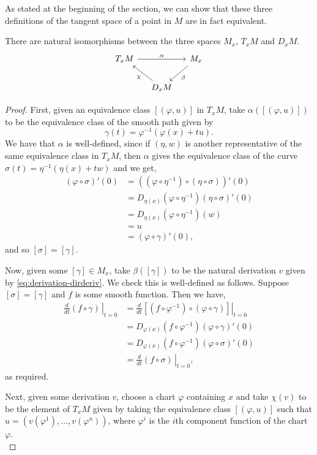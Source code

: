 As stated at the beginning of the section, we can show that these three definitions of the tangent space of a point in $M$ are in fact equivalent.
\begin{proposition}
There are natural isomorphisms between the three spaces $M_x$, $T_xM$ and $D_xM$.
\[
\begin{tikzcd}[column sep=small]
T_xM \arrow{rr}{\alpha} && M_x\arrow{dl}{\beta}\\
&D_xM\arrow{ul}{\chi}
\end{tikzcd}
\]
\end{proposition}
\begin{proof}
First, given an equivalence class $[(\varphi,u)]$ in $T_xM$, take $\alpha([(\varphi,u)])$ to be the equivalence class of the smooth path given by
\[
\gamma(t)=\varphi^{-1}(\varphi(x)+tu).
\]
We have that $\alpha$ is well-defined, since if $(\eta,w)$ is another representative of the same equivalence class in $T_xM$, then $\alpha$ gives the equivalence class of the curve $\sigma(t)=\eta^{-1}(\eta(x)+tw)$ and we get,
\begin{align*}
(\varphi\circ\sigma)'(0)&=\left((\varphi\circ\eta^{-1})\circ(\eta\circ\sigma) \right)'(0)\\
&=D_{\eta(x)}\left(\varphi\circ\eta^{-1} \right)(\eta\circ\sigma)'(0)\\
&=D_{\eta(x)}\left(\varphi\circ\eta^{-1}\right)(w)\\
&=u\\
&=(\varphi\circ\gamma)'(0),
\end{align*}
and so $[\sigma]=[\gamma]$.

Now, given some $[\gamma]\in M_x$, take $\beta([\gamma])$ to be the natural derivation $v$ given by \eqref{eq:derivation-dirderiv}. We check this is well-defined as follows. Suppose $[\sigma]=[\gamma]$ and $f$ is some smooth function. Then we have,
\begin{align*}
\left.\frac{d}{dt}(f\circ\gamma)\,\right\rvert_{t=0}&=\left.\frac{d}{dt}\left[(f\circ\varphi^{-1})\circ(\varphi\circ\gamma) \right]\right\rvert_{t=0}\\
&=D_{\varphi(x)}(f\circ\varphi^{-1})(\varphi\circ\gamma)'(0)\\
&=D_{\varphi(x)}(f\circ\varphi^{-1})(\varphi\circ\sigma)'(0)\\
&=\left.\frac{d}{dt}(f\circ\sigma)\,\right\rvert_{t=0},
\end{align*}
as required.

Next, given some derivation $v$, choose a chart $\varphi$ containing $x$ and take $\chi(v)$ to be the element of $T_xM$ given by taking the equivalence class $[(\varphi,u)]$ such that $u=\left(v(\varphi^1),\ldots,v(\varphi^n)\right)$, where $\varphi^i$ is the $i$th component function of the chart $\varphi$.\\


\end{proof}
